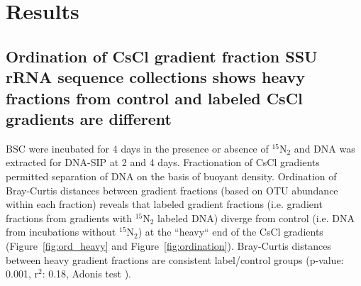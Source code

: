 \section{Results}
\subsection{Ordination of CsCl gradient fraction SSU rRNA sequence collections
shows heavy fractions from control and labeled CsCl gradients are
different} 
BSC were incubated for 4 days in the presence or absence of $^{15}$N$_{2}$ and
DNA was extracted for DNA-SIP at 2 and 4 days. Fractionation of CsCl gradients
permitted separation of DNA on the basis of buoyant density. Ordination of
Bray-Curtis \citep{Bray_1957} distances between gradient fractions (based on OTU
abundance within each fraction) reveals that labeled gradient fractions (i.e.
gradient fractions from gradients with $^{15}$N$_{2}$ labeled DNA) diverge from
control (i.e. DNA from incubations without $^{15}$N$_{2}$) at the ``heavy`` end
of the CsCl gradients (Figure~\ref{fig:ord_heavy} and
Figure~\ref{fig:ordination}). Bray-Curtis distances between heavy gradient
fractions are consistent label/control groups (p-value: 0.001, r$^{2}$: 0.18, 
Adonis test \citep{Anderson_2001}). 
